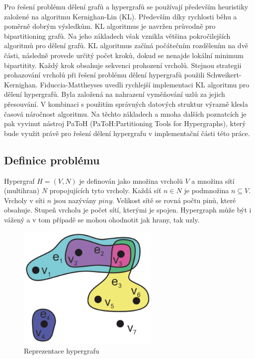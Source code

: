 \documentclass[thesis=M,czech]{FITthesis}[2012/06/26]
\begin{document}
Pro řešení problému dělení grafů a hypergrafů se používají především heuristiky založené na algoritmu Kernighan-Lin (KL). Především díky rychlosti běhu a poměrně dobrým výsledkům. KL algoritmus je navržen průvodně pro bipartitioning grafů. Na jeho základech však vznikla většina pokročilejších algoritmů pro dělení grafů. KL algoritmus začíná počátečním rozdělením na dvě části, následně provede určitý počet kroků, dokud se nenajde lokální minimum bipartitity. Každý krok obsahuje sekvenci prohození vrcholů. Stejnou strategii prohazování vrcholů při řešení problému dělení hypergrafů použili Schweikert-Kernighan\cite{graph1}. Fiduccia-Mattheyses\cite{graph2} uvedli rychlejší implementaci KL algoritmu pro dělení hypergrafů. Byla založená na nahrazení vyměňování uzlů za jejich přesouvání.  V kombinaci s použitím správných datových struktur výrazně klesla časová náročnost algoritmu. Na těchto základech a mnoha dalších poznatcích je pak vyvinut nástroj PaToH (PaToH:Partitioning Tools for Hypergraphs), který bude využit právě pro řešení dělení hypergrafu v implementační části této práce.

\subsection{Definice problému}
Hypergraf $H=(V,N)$ je definován jako množina vrcholů $V$ a množina	sítí (multihran) $N$ propojujících tyto vrcholy. Každá síť $n \in N$ je podmnožina $n \subseteq V$. Vrcholy v síti $n$ jsou nazývány $piny$. Velikost sítě se rovná počtu pinů, které obsahuje. Stupeň vrcholu je počet sítí, kterými je spojen. Hypergraph může být i vážený a v tom případě se mohou ohodnotit jak hrany, tak uzly.

\begin{figure}\centering
	\includegraphics[width=0.6\textwidth, angle=0]{files/Hypergraph.png}
	\caption[Reprezentace hypergrafu]{Reprezentace hypergrafu}\label{fig:hypergraph}
\end{figure}
\end{document}
